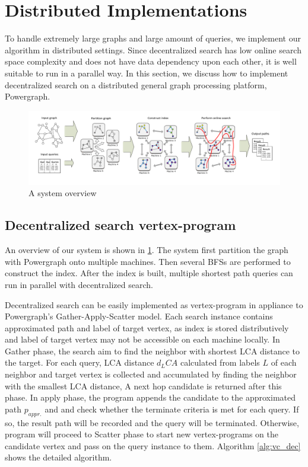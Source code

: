 \section{Distributed Implementations}
\label{implementation}

To handle extremely large graphs and large amount of queries, we implement our algorithm in distributed settings. Since decentralized search has low online search space complexity and does not have data dependency upon each other, it is well suitable to run in a parallel way. In this section, we discuss how to implement decentralized search on a distributed general graph processing platform, Powergraph\cite{180251}.

\begin{figure}[ht]
    \centering
    \includegraphics[width=\linewidth]{./figures/new_illustrate/System.pdf}
    \caption{A system overview}
    \label{fig:system}
\end{figure}

\subsection{Decentralized search vertex-program}

An overview of our system is shown in \ref{fig:system}. The system first partition the graph with Powergraph onto multiple machines. Then several BFSs are performed to construct the index. After the index is built, multiple shortest path queries can run in parallel with decentralized search.

Decentralized search can be easily implemented as vertex-program in appliance to Powergraph's Gather-Apply-Scatter model. Each search instance contains approximated path and label of target vertex, as index is stored distributively and label of target vertex may not be accessible on each machine locally. In Gather phase, the search aim to find the neighbor with shortest LCA distance to the target. For each query, LCA distance $d_LCA$ calculated from labels $L$ of each neighbor and target vertex is collected and accumulated by finding the neighbor with the smallest LCA distance, A next hop candidate is returned after this phase. In apply phase, the program appends the candidate to the approximated path $p_{appr.}$ and and check whether the terminate criteria is met for each query. If so, the result path will be recorded and the query will be terminated. Otherwise, program will proceed to Scatter phase to start new vertex-programs on the candidate vertex and pass on the query instance to them. Algorithm \ref{alg:vc_dec} shows the detailed algorithm.

